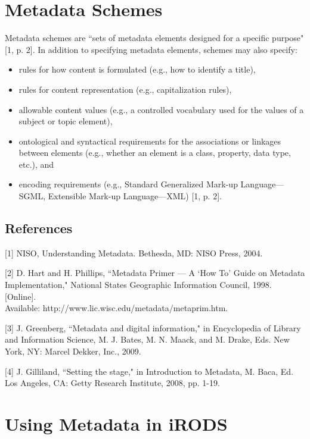 \documentclass[10pt,oneside]{memoir}
\begin{document}
\section{Metadata Schemes}

Metadata schemes are ``sets of metadata elements designed for a specific purpose" [1, p. 2]. In addition to specifying metadata elements, schemes may also specify:

\begin{itemize}
 \item rules for how content is formulated (e.g., how to identify a title),
 \item rules for content representation (e.g., capitalization rules),
 \item allowable content values (e.g., a controlled vocabulary used for the values of a subject or topic element),
 \item ontological and syntactical requirements for the associations or linkages between elements (e.g., whether an element is a class, property, data type, etc.), and
 \item encoding requirements (e.g., Standard Generalized Mark-up Language---SGML, Extensible Mark-up Language---XML) [1, p. 2].
 \end{itemize}

\subsection{References}

[1] NISO, Understanding Metadata. Bethesda, MD: NISO Press, 2004.

[2] D. Hart and H. Phillips, ``Metadata Primer --- A `How To' Guide on Metadata Implementation," National States Geographic Information Council, 1998. [Online]. \\
Available: http://www.lic.wisc.edu/metadata/metaprim.htm.

[3] J. Greenberg, ``Metadata and digital information," in Encyclopedia of Library and Information Science, M. J. Bates, M. N. Maack, and M. Drake, Eds. New York, NY: Marcel Dekker, Inc., 2009.

[4] J. Gilliland, ``Setting the stage," in Introduction to Metadata, M. Baca, Ed. Los Angeles, CA: Getty Research Institute, 2008, pp. 1-19.

\section{Using Metadata in iRODS}
\end{document}
